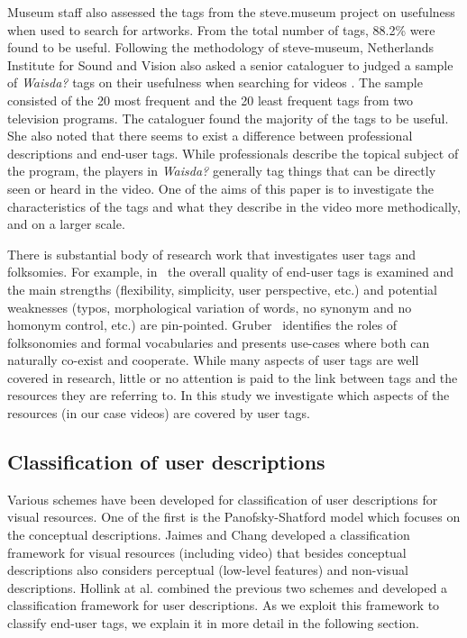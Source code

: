 Museum staff also assessed the tags from the steve.museum project on
usefulness when used to search for artworks. From the total number of tags,
88.2\% were found to be useful. Following the methodology of steve-museum,
Netherlands Institute for Sound and Vision also asked a senior cataloguer to
judged a sample of \emph{Waisda?} tags on their usefulness when searching for videos
\cite{waisda}. The sample consisted of the 20 most frequent and the 20 least
frequent tags from two television programs. The cataloguer found the majority
of the tags to be useful. She also noted that there seems to exist a
difference between professional descriptions and end-user tags. While
professionals describe the topical subject of the program, the players in
\emph{Waisda?} generally tag things that can be directly seen or heard in the
video. One of the aims of this paper is to investigate the characteristics of
the tags and what they describe in the video more methodically, and on a
larger scale.

There is substantial body of research work that investigates user tags and
folksomies. For example, in~\cite{citeulike:468899, citeulike:1421739} the
overall quality of end-user tags is examined and the main strengths
(flexibility, simplicity, user perspective, etc.) and potential weaknesses
(typos, morphological variation of words, no synonym and no homonym control,
etc.) are pin-pointed. Gruber~\cite{gruber_2007} identifies the roles of
folksonomies and formal vocabularies and presents use-cases where both can
naturally co-exist and cooperate. While many aspects of user tags are well
covered in research, little or no attention is paid to the link between tags
and the resources they are referring to. In this study we investigate which
aspects of the resources (in our case videos) are covered by user tags.

\subsection{Classification of user descriptions} 

Various schemes have been developed for classification of user descriptions
for visual resources. One of the first is the Panofsky-Shatford model
\cite{Panofsky, Shatford} which focuses on the conceptual descriptions. Jaimes
and Chang \cite{Jaimes00aconceptual} developed a classification framework for
visual resources (including video) that besides conceptual descriptions also
considers perceptual (low-level features) and non-visual descriptions. Hollink
at al. \cite{laurapaper} combined the previous two schemes and developed a
classification framework for user descriptions. As we exploit this framework
to classify end-user tags, we explain it in more detail in the following
section.

